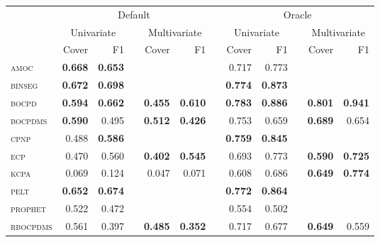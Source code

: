 \begin{tabular}{lrrcrrcrrcrr}
\toprule
 & \multicolumn{5}{c}{Default} &  & \multicolumn{5}{c}{Oracle} \\
\cmidrule(lr){2-6} \cmidrule(lr){8-12}
 & \multicolumn{2}{c}{Univariate} &  & \multicolumn{2}{c}{Multivariate} &  & \multicolumn{2}{c}{Univariate} &  & \multicolumn{2}{c}{Multivariate} \\
\cmidrule(lr){2-3} \cmidrule(lr){5-6} \cmidrule(lr){8-9} \cmidrule(lr){11-12}
 & Cover & F1 & & Cover & F1 & & Cover & F1 & & Cover & F1\\
\midrule
\textsc{amoc}     & \textbf{0.668} & \textbf{0.653} &  &                &                &  & 0.717          & 0.773          &  &                &                \\
\textsc{binseg}   & \textbf{0.672} & \textbf{0.698} &  &                &                &  & \textbf{0.774} & \textbf{0.873} &  &                &                \\
\textsc{bocpd}    & \textbf{0.594} & \textbf{0.662} &  & \textbf{0.455} & \textbf{0.610} &  & \textbf{0.783} & \textbf{0.886} &  & \textbf{0.801} & \textbf{0.941} \\
\textsc{bocpdms}  & \textbf{0.590} & 0.495          &  & \textbf{0.512} & \textbf{0.426} &  & 0.753          & 0.659          &  & \textbf{0.689} & 0.654          \\
\textsc{cpnp}     & 0.488          & \textbf{0.586} &  &                &                &  & \textbf{0.759} & \textbf{0.845} &  &                &                \\
\textsc{ecp}      & 0.470          & 0.560          &  & \textbf{0.402} & \textbf{0.545} &  & 0.693          & 0.773          &  & \textbf{0.590} & \textbf{0.725} \\
\textsc{kcpa}     & 0.069          & 0.124          &  & 0.047          & 0.071          &  & 0.608          & 0.686          &  & \textbf{0.649} & \textbf{0.774} \\
\textsc{pelt}     & \textbf{0.652} & \textbf{0.674} &  &                &                &  & \textbf{0.772} & \textbf{0.864} &  &                &                \\
\textsc{prophet}  & 0.522          & 0.472          &  &                &                &  & 0.554          & 0.502          &  &                &                \\
\textsc{rbocpdms} & 0.561          & 0.397          &  & \textbf{0.485} & \textbf{0.352} &  & 0.717          & 0.677          &  & \textbf{0.649} & 0.559          \\

\end{tabular}

